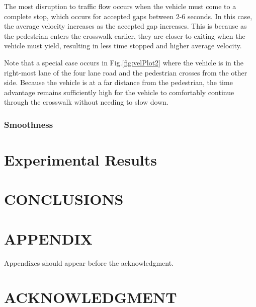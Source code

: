 \documentclass[letterpaper, 10 pt, conference]{ieeeconf}  %
\begin{document}
The most disruption to traffic flow occurs when the vehicle must come to a complete stop, which occurs for accepted gaps between 2-6 seconds. In this case, the average velocity increases as the accepted gap increases. This is because as the pedestrian enters the crosswalk earlier, they are closer to exiting when the vehicle must yield, resulting in less time stopped and higher average velocity. 

Note that a special case occurs in Fig.\ref{fig:velPlot2} where the vehicle is in the right-most lane of the four lane road and the pedestrian crosses from the other side. Because the vehicle is at a far distance from the pedestrian, the time advantage remains sufficiently high for the vehicle to comfortably continue through the crosswalk without needing to slow down.  

\subsubsection{Smoothness}


\section{Experimental Results}
\label{sec:expres}






\section{CONCLUSIONS}


\addtolength{\textheight}{-12cm}   %







\section*{APPENDIX}

Appendixes should appear before the acknowledgment.

\section*{ACKNOWLEDGMENT}










\end{document}
